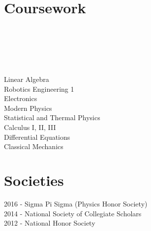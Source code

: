 \documentclass[]{deedy-resume-openfont}
\begin{document}
\begin{minipage}[t]{0.33\textwidth}
\section{Coursework}
 \\
 \\
 \\
 \\
 \\
Linear Algebra \\
Robotics Engineering 1 \\
Electronics \\
Modern Physics \\
Statistical and Thermal Physics \\
Calculus I, II, III \\
Differential Equations \\
Classical Mechanics \\
\sectionsep


\section{Societies} 
2016 - Sigma Pi Sigma (Physics Honor Society)\\
2014 - National Society of Collegiate Scholars\\
2012 - National Honor Society\\
\sectionsep

%
%

\end{minipage} 
\hfill
\end{document}
